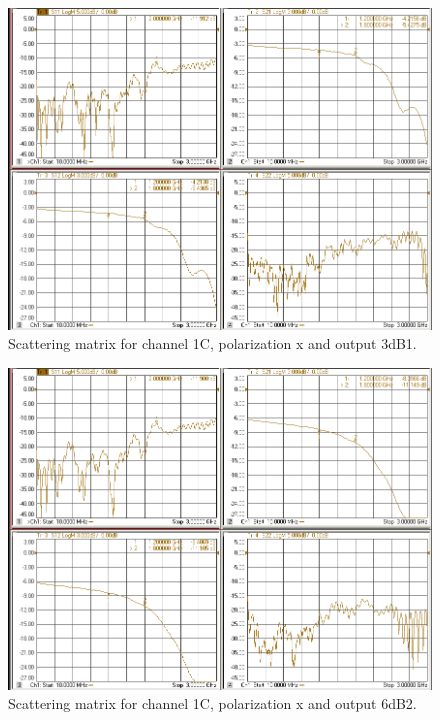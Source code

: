 \documentclass[12pt,a4paper,oneside]{article}
\begin{document}
\begin{figure}[H]
\centering
\includegraphics[width=0.9\linewidth]{VNA_results/1Cx_3dB1.png}
\caption{Scattering matrix for channel 1C, polarization x and output 3dB1.}
\label{fig:1Cx_3dB1}
\end{figure}


\begin{figure}[H]
\centering
\includegraphics[width=0.9\linewidth]{VNA_results/1Cx_6dB2.png}
\caption{Scattering matrix for channel 1C, polarization x and output 6dB2.}
\label{fig:1Cx_6dB2}
\end{figure}
\end{document}
